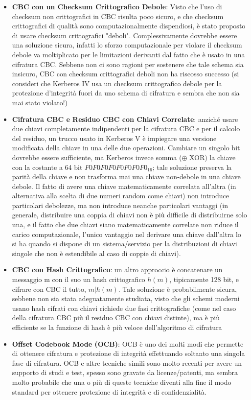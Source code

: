 \begin{itemize}
\item \textbf{CBC con un Checksum Crittografico Debole}: Visto che l'uso di checksum non crittografici in CBC risulta poco sicuro, e che checksum crittografici di qualità sono computazionalmente dispendiosi, è stato proposto di usare checksum crittografici "deboli". Complessivamente dovrebbe essere una soluzione sicura, infatti lo sforzo computazionale per violare il checksum debole va moltiplicato per le limitazioni derivanti dal fatto che è usato
in una cifratura CBC. Sebbene non ci sono ragioni per sostenere che tale schema sia insicuro, CBC con checksum crittografici deboli non ha riscosso successo (si consideri che Kerberos IV usa un checksum crittografico debole per la protezione d'integrità fuori da uno schema di cifratura e sembra che non sia mai stato violato!)
\item \textbf{Cifratura CBC e Residuo CBC con Chiavi Correlate}: anziché usare due chiavi completamente indipendenti per la cifratura CBC e per il calcolo del residuo, un trucco usato in Kerberos V è impiegare una versione modificata della chiave in una delle due operazioni. Cambiare un singolo bit dovrebbe essere sufficiente, ma Kerberos invece somma ($\oplus$ XOR) la chiave con la costante a 64 bit $F0F0F0F0F0F0F0F0_{16}$; tale soluzione preserva la parità della chiave e non trasforma mai una chiave non-debole in una chiave debole. Il fatto di avere una chiave matematicamente correlata all'altra (in alternativa alla scelta di due numeri random come chiavi) non introduce particolari debolezze, ma non introduce neanche particolari vantaggi (in generale, distribuire una coppia di chiavi non è più difficile di distribuirne solo una, e il fatto che due chiavi siano matematicamente correlate non riduce il carico computazionale, l'unico vantaggio nel derivare una chiave dall'altra lo si ha quando si dispone di un sistema/servizio per la distribuzioni di chiavi singole che non è estendibile al caso di coppie di chiavi).
\item \textbf{CBC con Hash Crittografico}: un altro approccio è concatenare un messaggio m con il suo un hash
crittografico $h(m)$, tipicamente 128 bit, e cifrare con CBC il tutto, $m|h(m)$. Tale soluzione è probabilmente sicura, sebbene non sia stata adeguatamente studiata, visto che gli schemi moderni usano hash cifrati con chiavi richiede due fasi crittografiche (come nel caso della cifratura CBC più il residuo CBC con chiavi distinte), ma è più efficiente se la funzione di hash è più veloce dell'algoritmo di cifratura 
\item \textbf{Offset Codebook Mode (OCB)}: OCB è uno dei molti modi che permette di ottenere cifratura e protezione di integrità effettuando soltanto una singola fase di cifratura. OCB e altre tecniche simili sono molto recenti per
avere un supporto di studi e test, spesso sono gravate da licenze/patenti, ma sembra molto probabile che una o più di
queste tecniche diventi alla fine il modo standard per ottenere protezione di integrità e di confidenzialità.
\end{itemize}

